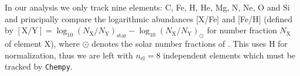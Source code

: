 \documentclass{aa}
\begin{document}
%
In our analysis we only track nine elements: C, Fe, H, He, Mg, N, Ne, O and Si and principally compare the logarithmic abundances [X/Fe] and [Fe/H] (defined by 
    $[\mathrm{X}/\mathrm{Y}] = \log_{10}(N_\mathrm X/N_\mathrm Y)_\mathrm{star} - \log_{10}(N_\mathrm X/N_\mathrm Y)_\odot$
for number fraction $N_\mathrm X$ of element X), where $\odot$ denotes the solar number fractions of \citet{2009ARA&A..47..481A}. This uses H for normalization, thus we are left with $n_\mathrm{el}=8$ independent elements which must be tracked by \texttt{Chempy}.%
\end{document}
